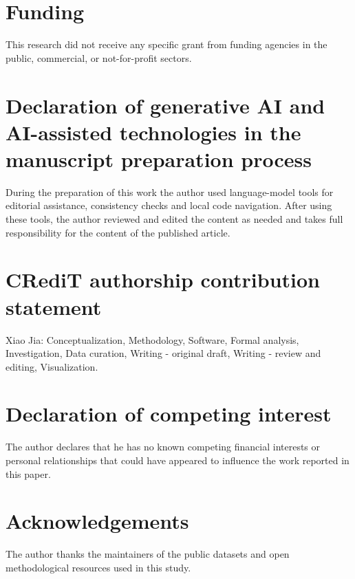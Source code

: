 ﻿\documentclass[preprint,12pt,authoryear]{elsarticle}
\begin{document}
\section*{Funding}

This research did not receive any specific grant from funding agencies in the public, commercial, or not-for-profit sectors.

\section*{Declaration of generative AI and AI-assisted technologies in the manuscript preparation process}

During the preparation of this work the author used language-model tools for editorial assistance, consistency checks and local code navigation. After using these tools, the author reviewed and edited the content as needed and takes full responsibility for the content of the published article.

\section*{CRediT authorship contribution statement}

Xiao Jia: Conceptualization, Methodology, Software, Formal analysis, Investigation, Data curation, Writing - original draft, Writing - review and editing, Visualization.

\section*{Declaration of competing interest}

The author declares that he has no known competing financial interests or personal relationships that could have appeared to influence the work reported in this paper.

\section*{Acknowledgements}

The author thanks the maintainers of the public datasets and open methodological resources used in this study.



\end{document}
